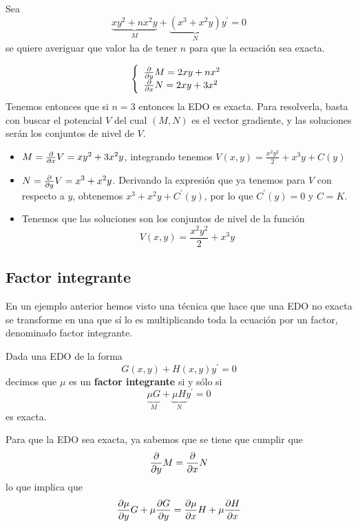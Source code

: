\begin{example}
Sea
$$\underbrace{xy^2+nx^2y}_M+\underbrace{(x^3+x^2y)}_Ny^\prime = 0$$
se quiere averiguar que valor ha de tener $n$ para que la ecuación sea exacta.

$$
  \left\lbrace
  \begin{array}{l}
     \frac{\partial}{\partial y}M = 2xy+nx^2 \\
     \frac{\partial}{\partial x}N = 2xy+3x^2 \\
  \end{array}
  \right.
$$
Tenemos entonces que si $n=3$ entonces la EDO es exacta. Para resolverla, basta con buscar el potencial $V$ del cual $(M,N)$ es el vector gradiente, y las soluciones serán los conjuntos de nivel de $V$.
\begin{itemize}
\item $M = \frac{\partial}{\partial x}V = xy^2+3x^2y$, integrando tenemos $V(x,y) = \frac{x^2y^2}{2}+x^3y+C(y)$
\item $N = \frac{\partial}{\partial y}V = x^3+x^2y$. Derivando la expresión que ya tenemos para $V$ con respecto a $y$, obtenemos $x^3+x^2y+C^\prime(y)$, por lo que $C^\prime(y) = 0$ y $C=K$.
\item Tenemos que las soluciones son los conjuntos de nivel de la función $$V(x,y) = \frac{x^2y^2}{2}+x^3y$$
\end{itemize}
\end{example}

\subsection{Factor integrante}
En un ejemplo anterior hemos visto una técnica que hace que una EDO no exacta se transforme en una que sí lo es multiplicando toda la ecuación por un factor, denominado factor integrante.

\begin{definition}
Dada una EDO de la forma $$G(x,y)+H(x,y)y^\prime = 0$$ decimos que $\mu$ es un \textbf{factor integrante} si y sólo si $$\underbrace{\mu G}_{M}+\underbrace{\mu H}_{N}y^\prime = 0$$ es exacta.
\end{definition}

Para que la EDO sea exacta, ya sabemos que se tiene que cumplir que $$\frac{\partial}{\partial y}M = \frac{\partial}{\partial x}N$$ lo que implica que
\begin{equation}
\partialder{y}{\mu}G+\mu\partialder{y}{G} = \partialder{x}{\mu}H+\mu\partialder{x}{H}
\label{eq:factor_integrante}
\end{equation}

